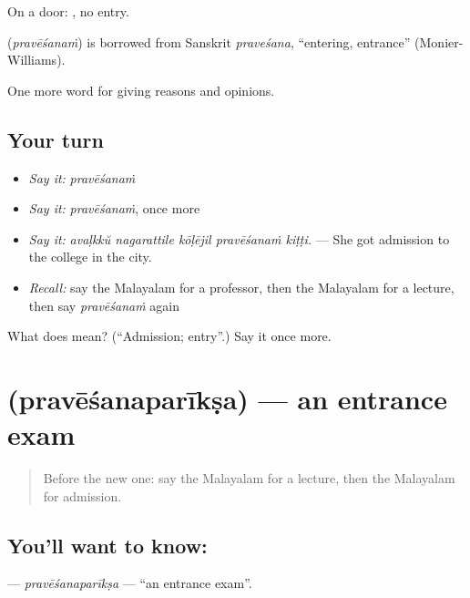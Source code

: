 On a door:  , no entry.

\begin{cousinweb}
\textbf{} (\emph{pravēśanaṁ}) is borrowed from Sanskrit \emph{praveśana}, \textquotedblleft{}entering, entrance\textquotedblright{} (Monier-Williams).
\end{cousinweb}

\begin{grammarlens}[title={What you've built}]
One more word for giving reasons and opinions.
\end{grammarlens}

\subsection*{Your turn}
\begin{itemize}
\raggedright
  \item \emph{Say it:} \emph{pravēśanaṁ}
  \item \emph{Say it:} \emph{pravēśanaṁ}, once more
  \item \emph{Say it:} \emph{avaḷkkŭ nagarattile kōḷējil pravēśanaṁ kiṭṭi.} — She got admission to the college in the city.
  \item \emph{Recall:} say the Malayalam for a professor, then the Malayalam for a lecture, then say \emph{pravēśanaṁ} again
\end{itemize}

\begin{tcolorbox}[breakable,colback=teal!4,colframe=teal!35!black,title={Before you move on}]
What does  mean? (\textquotedblleft{}Admission; entry\textquotedblright{}.) Say it once more.
\end{tcolorbox}
\section[\texorpdfstring{\ml{പ്രവേശനപരീക്ഷ} (pravēśanaparīkṣa)}{പ്രവേശനപരീക്ഷ (pravēśanaparīkṣa)}]{ (pravēśanaparīkṣa) — an entrance exam}

\label{lesson:ML-C433-pravesanapariksa}



\begin{quote}
Before the new one: say the Malayalam for a lecture, then the Malayalam for admission.
\end{quote}

\subsection*{You'll want to know: }
\textbf{} — \emph{pravēśanaparīkṣa} — \textquotedblleft{}an entrance exam\textquotedblright{}.

